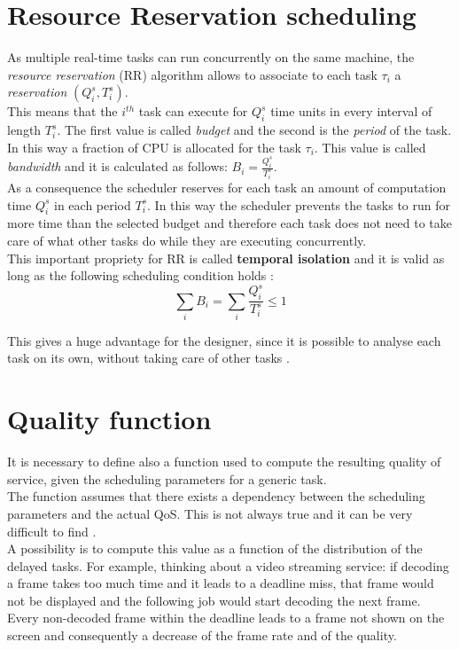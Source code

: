 \section{Resource Reservation scheduling}
As multiple real-time tasks can run concurrently on the same machine, the \emph{resource reservation} (RR) algorithm allows to associate to each task \( \tau_{i} \) a \emph{reservation} \( \left(Q_{i}^s, T_{i}^s\right) \).\\ 
This means that the \( i^{th} \) task can execute for \( Q_{i}^s \) time units in every interval of length \( T_{i}^s \). The first value is called \emph{budget} and the second is the \emph{period} of the task.\\
In this way a fraction of CPU is allocated for the task \( \tau_{i} \). This value is called \emph{bandwidth} and it is calculated as follows: \( B_{i} = \frac{Q_{i}^s}{T_{i}^s}\).\\
As a consequence the scheduler reserves for each task an amount of computation time \( Q_{i}^s \) in each period \( T_{i}^s \). In this way the scheduler prevents the tasks to run for more time than the selected budget and therefore each task does not need to take care of what other tasks do while they are executing concurrently.\\
This important propriety for RR is called \textbf{temporal isolation} and it is valid as long as the following scheduling condition holds \cite{realtimehandbook}:
\begin{equation} \tag{1} \label{schedCond}
  \displaystyle\sum_{i} B_{i} =  \displaystyle\sum_{i} \frac{Q_{i}^s}{T_{i}^s} \leq 1
\end{equation}

This gives a huge advantage for the designer, since it is possible to analyse each task on its own, without taking care of other tasks \cite{probGuarantees}.

\section{Quality function}
It is necessary to define also a function used to compute the resulting quality of service, given the scheduling parameters for a generic task.\\
The function assumes that there exists a dependency between the scheduling parameters and the actual QoS. This is not always true and it can be very difficult to find \cite{prosit}.\\
A possibility is to compute this value as a function of the distribution of the delayed tasks. For example, thinking about a video streaming service: if decoding a frame takes too much time and it leads to a deadline miss, that frame would not be displayed and the following job would start decoding the next frame. Every non-decoded frame within the deadline leads to a frame not shown on the screen and consequently a decrease of the frame rate and of the quality. 


